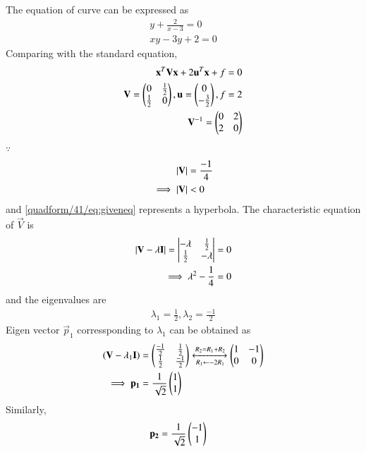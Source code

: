 
The equation of curve can be expressed as 
\begin{align}
  y+\frac{2}{x-3}=0  \\
  xy-3y+2=0\label{quadform/41/eq:giveneq}
\end{align}
Comparing with the standard equation, 
\begin{align}
\mathbf{x}^T\mathbf{V}\mathbf{x}+2\mathbf{u}^T\mathbf{x}+f=0\\
\mathbf{V}=\begin{pmatrix}0&\frac{1}{2}\\\frac{1}{2}&0\end{pmatrix},\mathbf{u}=\begin{pmatrix}0\\-\frac{3}{2}\end{pmatrix},f=2\\
\mathbf{V}^{-1}=\begin{pmatrix}0&2\\2&0\end{pmatrix}
\end{align}
$\because$
\begin{align}
    \left\vert\mathbf{V}\right\vert &= \frac{-1}{4}
    \\
    \implies \left\vert\mathbf{V}\right\vert &< 0
\end{align}
and \eqref{quadform/41/eq:giveneq} represents a hyperbola.
The characteristic equation of $\vec{V}$ is 
\begin{align}
    \left\vert\mathbf{V} - \lambda\mathbf{I}\right\vert = \begin{vmatrix}-\lambda & \frac{1}{2} \\ \frac{1}{2} & -\lambda\end{vmatrix} &= 0
    \\
    \implies \lambda^2 - \frac{1}{4} &= 0
\end{align}
and the eigenvalues are 
\begin{align}
    \lambda_1 = \frac{1}{2} , \lambda_2 = \frac{-1}{2}
\end{align}
Eigen vector $\vec{p}_1$ corressponding to $\lambda_1$ can be obtained as
\begin{align}
    (\mathbf{V} - \lambda_1\mathbf{I}) &= \begin{pmatrix}\frac{-1}{2} & \frac{1}{2} \\ \frac{1}{2} & \frac{-1}{2}\end{pmatrix}\xleftrightarrow[R_1 \leftarrow -2R_1]{R_2 = R_1 + R_2}\begin{pmatrix}1 & -1 \\ 0 & 0\end{pmatrix}
    \\
    \implies \mathbf{p_1} &= \frac{1}{\sqrt{2}}\begin{pmatrix}1 \\ 1\end{pmatrix}
\end{align}
Similarly,
\begin{align}
    \mathbf{p_2} &= \frac{1}{\sqrt{2}}\begin{pmatrix}-1 \\ 1\end{pmatrix}
\end{align}
